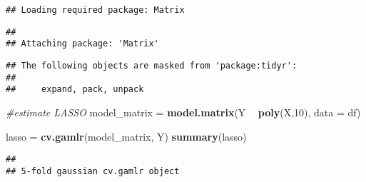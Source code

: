 \documentclass[
]{article}
\newenvironment{Shaded}{\begin{snugshade}}{\end{snugshade}}
\newcommand{\CommentTok}[1]{\textcolor[rgb]{0.56,0.35,0.01}{\textit{#1}}}
\newcommand{\DataTypeTok}[1]{\textcolor[rgb]{0.13,0.29,0.53}{#1}}
\newcommand{\DecValTok}[1]{\textcolor[rgb]{0.00,0.00,0.81}{#1}}
\newcommand{\KeywordTok}[1]{\textcolor[rgb]{0.13,0.29,0.53}{\textbf{#1}}}
\newcommand{\NormalTok}[1]{#1}
\newcommand{\OperatorTok}[1]{\textcolor[rgb]{0.81,0.36,0.00}{\textbf{#1}}}
\newcommand{\StringTok}[1]{\textcolor[rgb]{0.31,0.60,0.02}{#1}}
\begin{document}
\begin{verbatim}
## Loading required package: Matrix
\end{verbatim}

\begin{verbatim}
## 
## Attaching package: 'Matrix'
\end{verbatim}

\begin{verbatim}
## The following objects are masked from 'package:tidyr':
## 
##     expand, pack, unpack
\end{verbatim}

\begin{Shaded}
\begin{Highlighting}[]
\CommentTok{#estimate LASSO}
\NormalTok{model_matrix =}\StringTok{ }\KeywordTok{model.matrix}\NormalTok{(Y }\OperatorTok{~}\StringTok{ }\KeywordTok{poly}\NormalTok{(X,}\DecValTok{10}\NormalTok{), }\DataTypeTok{data =}\NormalTok{ df)}

\NormalTok{lasso =}\StringTok{ }\KeywordTok{cv.gamlr}\NormalTok{(model_matrix, Y)}
\KeywordTok{summary}\NormalTok{(lasso)}
\end{Highlighting}
\end{Shaded}

\begin{verbatim}
## 
## 5-fold gaussian cv.gamlr object
\end{verbatim}
\end{document}

